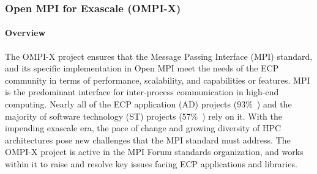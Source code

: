 \subsubsection{ Open MPI for Exascale (OMPI-X)}\label{subsubsect:openmpi}



\paragraph{Overview}

The OMPI-X project ensures that the Message Passing Interface (MPI)
standard, and its specific implementation in Open MPI meet the needs
of the ECP community in terms of performance, scalability, and
capabilities or features. MPI is the predominant interface for
inter-process communication in high-end computing.  Nearly all of the
ECP application (AD) projects (93\%~\cite{Bernholdt:2018:SMU-tr})
and the majority of software technology (ST) projects
(57\%~\cite{Bernholdt:2018:SMU-tr}) rely on it.
With the impending exascale era, the
pace of change and growing diversity of HPC architectures pose new
challenges that the MPI standard must address.  The OMPI-X project is
active in the MPI Forum standards organization, and works within it to
raise and resolve key issues facing ECP applications and libraries.

